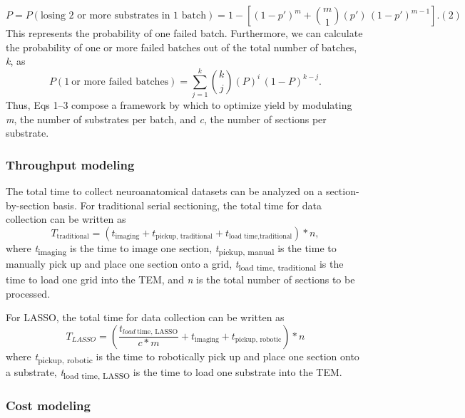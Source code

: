 \documentclass{article}
\begin{document}
\[ P = P(\text{losing 2 or more substrates in 1 batch}) = 1 - \left[(1 - p')^{m} + \binom{m}{1} (p') \, (1 - p')^{m-1}\right].(2) \]
This represents the probability of one failed batch. Furthermore, we can calculate the probability of one or more failed batches out of the total number of batches, \emph{k}, as
\begin{equation*} P(1\ \text{or more failed batches}) = \textstyle\sum_{j=1}^{k} \displaystyle\binom{k}{j} (P)^{i} \, (1 - P)^{k-j}. \tag{3} \end{equation*}
Thus, Eqs 1–3 compose a framework by which to optimize yield by modulating \emph{m}, the number of substrates per batch, and \emph{c}, the number of sections per substrate.

\subsubsection*{Throughput modeling}

The total time to collect neuroanatomical datasets can be analyzed on a section-by-section basis. For traditional serial sectioning, the total time for data collection can be written as
\begin{equation*} T_{\text{traditional}} = (t_{\text{imaging}} + t_{\text{pickup, traditional}} + t_{\text{load time,traditional}}) \ast n, \tag{4} \end{equation*}
where \emph{t}\textsubscript{imaging} is the time to image one section, \emph{t}\textsubscript{pickup, manual} is the time to manually pick up and place one section onto a grid, \emph{t}\textsubscript{load time, traditional} is the time to load one grid into the TEM, and \emph{n} is the total number of sections to be processed.

For LASSO, the total time for data collection can be written as
\begin{equation*} T_{LASSO} = \left(\frac{t_{\textit{load}\ \text{time, LASSO}}}{c \ast m} + t_{\text{imaging}} + t_{\text{pickup, robotic}}\right) \ast n \tag{5} \end{equation*}
where \emph{t}\textsubscript{pickup, robotic} is the time to robotically pick up and place one section onto a substrate, \emph{t}\textsubscript{load time, LASSO} is the time to load one substrate into the TEM.

\subsubsection*{Cost modeling}
\end{document}
